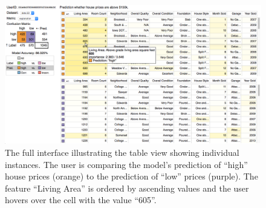 \begin{figure}[ht!]
\centering
\includegraphics[width=0.7\linewidth]{aggexplain/full_table_expl}
\caption{
The full interface illustrating the table view showing individual instances.
The user is comparing the model's prediction of ``high'' house prices (orange) to the prediction of ``low'' prices (purple).
The feature ``Living Area'' is ordered by ascending values and the user hovers over the cell with the value ``605''.
}
\label{figs:full_view}
\end{figure}
